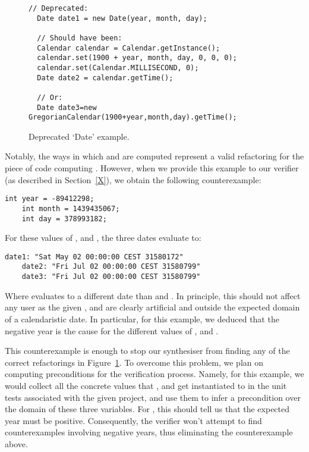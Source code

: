\documentclass[runningheads,a4paper]{llncs}
\begin{document}
\begin{figure}
  \begin{lstlisting}[mathescape=true,showstringspaces=false]
  // Deprecated:
  Date date1 = new Date(year, month, day);

  // Should have been:
  Calendar calendar = Calendar.getInstance();
  calendar.set(1900 + year, month, day, 0, 0, 0);
  calendar.set(Calendar.MILLISECOND, 0);
  Date date2 = calendar.getTime();
    
  // Or:
  Date date3=new GregorianCalendar(1900+year,month,day).getTime();
  \end{lstlisting}
\caption{Deprecated `Date' example.}
\label{ex:three-dates}
\end{figure}

Notably, the ways in which  and  are computed
represent a valid refactoring for the piece of code computing
. However, when we provide this example to our
verifier (as described in Section~\ref{X}), we obtain the following
counterexample:

  \begin{lstlisting}[mathescape=true,showstringspaces=false]
    int year = -89412298;
    int month = 1439435067;
    int day = 378993182;
  \end{lstlisting}

  For these values of ,  and , the three
  dates evaluate to:

  \begin{lstlisting}[mathescape=true,showstringspaces=false]
    date1: "Sat May 02 00:00:00 CEST 31580172"
    date2: "Fri Jul 02 00:00:00 CEST 31580799"
    date3: "Fri Jul 02 00:00:00 CEST 31580799"
  \end{lstlisting}

  Where  evaluates to a different date than  and . In principle, this should not affect any user as the given
  ,  and  are clearly artificial and outside the expected domain of a calendaristic date.
  In particular, for this example, we deduced that the negative year is the cause for the different values of ,  and .

  This counterexample is enough to stop our synthesiser from finding any of the correct refactorings in Figure~\ref{ex:three-dates}.
  To overcome this problem, we plan on computing preconditions for the verification process. Namely, for this example, we would collect all the concrete values that
  ,  and  get instantiated to in the unit tests associated with the given project, and use them to
  infer a precondition over the domain of these three variables. For , this should tell us that the expected year must be positive.
  Consequently, the verifier won't attempt to find counterexamples involving negative years, thus eliminating the counterexample above.
\end{document}
